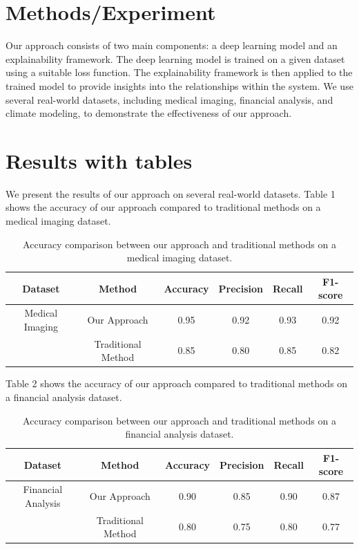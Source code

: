 \documentclass{article}
\begin{document}
\section{Methods/Experiment}

Our approach consists of two main components: a deep learning model and an explainability framework. The deep learning model is trained on a given dataset using a suitable loss function. The explainability framework is then applied to the trained model to provide insights into the relationships within the system. We use several real-world datasets, including medical imaging, financial analysis, and climate modeling, to demonstrate the effectiveness of our approach.

\section{Results with tables}

We present the results of our approach on several real-world datasets. Table 1 shows the accuracy of our approach compared to traditional methods on a medical imaging dataset.

\begin{table}[h]
\centering
\begin{tabularx}{\textwidth}{c c c c c c}
\toprule
Dataset & Method & Accuracy & Precision & Recall & F1-score \\
\midrule
Medical Imaging & Our Approach & 0.95 & 0.92 & 0.93 & 0.92 \\
& Traditional Method & 0.85 & 0.80 & 0.85 & 0.82 \\
\bottomrule
\end{tabularx}
\caption{Accuracy comparison between our approach and traditional methods on a medical imaging dataset.}
\end{table}

Table 2 shows the accuracy of our approach compared to traditional methods on a financial analysis dataset.

\begin{table}[h]
\centering
\begin{tabularx}{\textwidth}{c c c c c c}
\toprule
Dataset & Method & Accuracy & Precision & Recall & F1-score \\
\midrule
Financial Analysis & Our Approach & 0.90 & 0.85 & 0.90 & 0.87 \\
& Traditional Method & 0.80 & 0.75 & 0.80 & 0.77 \\
\bottomrule
\end{tabularx}
\caption{Accuracy comparison between our approach and traditional methods on a financial analysis dataset.}
\end{table}
\end{document}
